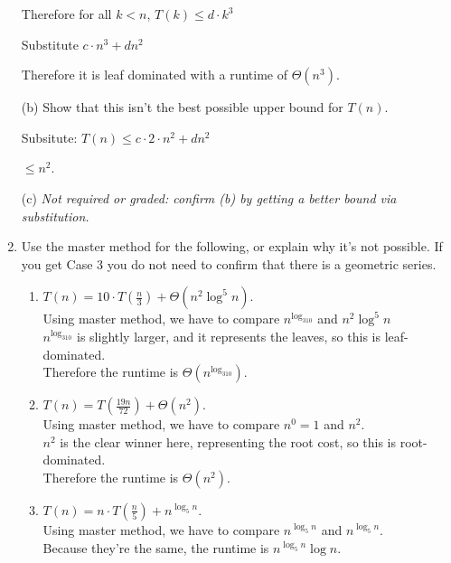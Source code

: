 \documentclass[12pt]{article}
\begin{document}
\begin{enumerate}
Therefore for all $k < n$, $T(k) \leq d \cdot k^3$

Substitute $c \cdot n^3 + dn^2$

Therefore it is leaf dominated with a runtime of $\Theta(n^3)$.
  
(b) Show that this isn't the best possible upper bound for $T(n)$. 

Subsitute: $T(n) \leq  c \cdot 2 \cdot n^2 + d n^2$

$\leq n^2$.

(c) {\em  Not required or graded: confirm (b) by getting a better bound via substitution.}\\

\pagebreak


\item Use the master method for the following, or explain why it's not possible.  If you get Case 3 you  do not need to confirm that there is a geometric series.
\begin{enumerate}

\itemsep-0.35cm

\item  $T(n)= 10\cdot T(\frac{n}{3}) + \Theta(n^2\log^5 n)$.\\

Using master method, we have to compare $n^{\log_310}$ and $n^2\log^5n$\\
$n^{\log_310}$ is slightly larger, and it represents the leaves, so this is leaf-dominated.\\
Therefore the runtime is $\Theta(n^{\log_310})$.\\

\item $T(n) = T(\frac{19n}{72}) + \Theta(n^2)$.\\

Using master method, we have to compare $n^0 = 1$ and $n^2$.\\
$n^2$ is the clear winner here, representing the root cost, so this is root-dominated.\\
Therefore the runtime is $\Theta(n^2)$.\\

\item $T(n) = n\cdot T(\frac{n}{5}) + n^{\log_5 n}$.\\

Using master method, we have to compare $n^{\log_5 n}$ and $n^{\log_5n}$.\\
Because they're the same, the runtime is $n^{\log_5n}\log n$.\\


\end{enumerate}
\end{enumerate}
\end{document}

